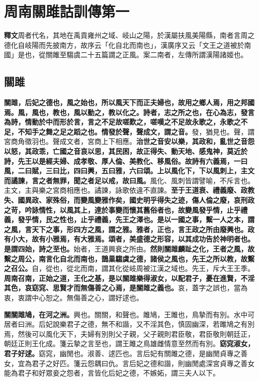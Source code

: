 \chapter{周南關雎詁訓傳第一}

\begin{quoting}\textbf{釋文}周者代名，其地在禹貢雍州之域、岐山之陽，於漢屬扶風美陽縣，南者言周之德化自岐陽而先披南方，故序云「化自北而南也」，漢廣序又云「文王之道被於南國」是也，從關雎至騶虞二十五篇謂之正風。案二南者，左傳所謂漢陽諸姬也。\end{quoting}

\section{關雎}


\textbf{關雎，后妃之德也，風之始也，所以風天下而正夫婦也，故用之鄉人焉，用之邦國焉。風，風也，教也，風以動之，教以化之。詩者，志之所之也，在心為志，發言為詩，情動於中而形於言，言之不足故嗟歎之，嗟嘆之不足故永歌之，永歌之不足，不知手之舞之足之蹈之也。情發於聲，聲成文，謂之音。}{\footnotesize 發，猶見也。聲，謂宮商角徵羽也。聲成文者，宮商上下相應。}\textbf{治世之音安以樂，其政和，亂世之音怨以怒，其政乖，亡國之音哀以思，其民困，故正得失、動天地、感鬼神，莫近於詩，先王以是經夫婦、成孝敬、厚人倫、美教化、移風俗。故詩有六義焉，一曰風，二曰賦，三曰比，四曰興，五曰雅，六曰頌。上以風化下，下以風刺上，主文而譎諫，言之者無罪，聞之者足以戒，故曰風。}{\footnotesize 風化、風刺皆謂譬喻，不斥言也。主文，主與樂之宮商相應也。譎諫，詠歌依違不直諫。}\textbf{至于王道衰、禮義廢、政教失、國異政、家殊俗，而變風變雅作矣，國史明乎得失之迹，傷人倫之廢，哀刑政之苛，吟詠情性，以風其上，達於事變而懷其舊俗者也，故變風發乎情，止乎禮義，發乎情，民之性也，止乎禮義，先王之澤也。是以一國之事，繫一人之本，謂之風，言天下之事，形四方之風，謂之雅。雅者，正也，言王政之所由廢興也。政有小大，故有小雅焉，有大雅焉。頌者，美盛德之形容，以其成功告於神明者也。是謂四始，詩之至也。}{\footnotesize 始者，王道興衰之所由。}\textbf{然則關雎麟趾之化，王者之風，故繫之周公，南言化自北而南也，鵲巢騶虞之德，諸侯之風也，先王之所以教，故繫之召公。}{\footnotesize 自，從也，從北而南，謂其化從岐周被江漢之域也。先王，斥大王王季。}\textbf{周南召南，正始之道，王化之基，是以關雎樂得淑女，以配君子，憂在進賢，不淫其色，哀窈窕、思賢才而無傷善之心焉，是關雎之義也。}{\footnotesize 哀，蓋字之誤也，當為衷，衷謂中心恕之。無傷善之心，謂好逑也。}

\textbf{關關雎鳩，在河之洲。}{\footnotesize 興也。關關，和聲也。雎鳩，王雎也，鳥摯而有別。水中可居者曰洲。后妃說樂君子之德，無不和諧，又不淫其色，慎固幽深，若雎鳩之有別焉，然後可以風化天下，夫婦有別則父子親，父子親則君臣敬，君臣敬則朝廷正，朝廷正則王化成。箋云摯之言至也，謂王雎之鳥雄雌情意至然而有別。}\textbf{窈窕淑女，君子好逑。}{\footnotesize 窈窕，幽閒也。淑善、逑匹也。言后妃有關雎之德，是幽閒貞專之善女，宜為君子之好匹。箋云怨耦曰仇。言后妃之德和諧，則幽閒處深宮貞專之善女能為君子和好眾妾之怨者，言皆化后妃之德，不嫉妬，謂三夫人以下。}

